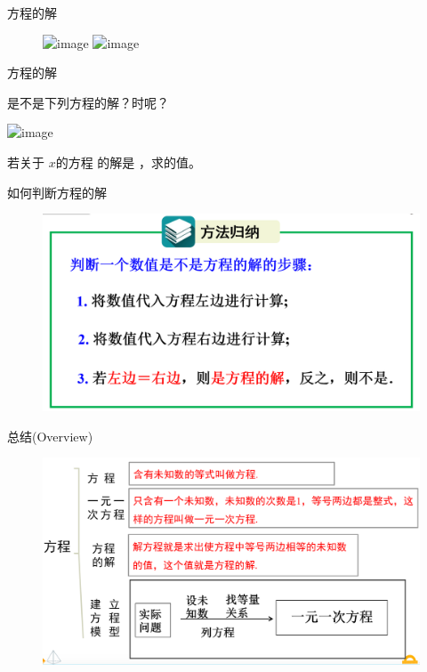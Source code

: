 \begin{frame}{方程的解}
    \begin{figure}
        \includegraphics<1>[width=.9\textwidth]{assets/solution.png}
        \includegraphics<2>[width=.9\textwidth]{assets/solution2.png}
    \end{figure}
\end{frame}

\begin{frame}{方程的解}
    \begin{block}{是不是下列方程的解？时呢？}
    \end{block}
    \includegraphics<2>[width=.5\textwidth]{assets/solution3.png}
\end{frame}

\begin{frame}
    \begin{block}{}
        若关于 $x$的方程 的解是 ，求的值。
    \end{block}
\end{frame}

\begin{frame}{如何判断方程的解}
    \begin{figure}
        \includegraphics[width=.9\textwidth]{assets/solutions.png}
    \end{figure}
\end{frame}

\begin{frame}{总结(Overview)}
    \begin{figure}
        \includegraphics[width=.99\textwidth]{assets/overview.png}
    \end{figure}
\end{frame}

